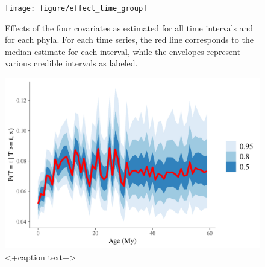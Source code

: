 \documentclass[12pt,letterpaper]{article}
\begin{document}
\begin{figure}[ht]
  \centering
  \texttt{[image: figure/effect\_time\_group]}
  \caption{Effects of the four covariates as estimated for all time intervals and for each phyla. For each time series, the red line corresponds to the median estimate for each interval, while the envelopes represent various credible intervals as labeled.}
  \label{fig:effect_time_group}
\end{figure}




\begin{figure}[ht]
  \centering
  \includegraphics[width=\textwidth,height=0.5\textheight,keepaspectratio=true]{figure/hazard_baseline}
  \caption{<+caption text+>}
  \label{fig:hazard_baseline}
\end{figure}
\end{document}
